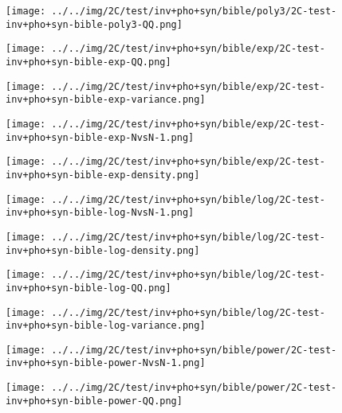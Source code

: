 \begin{figure}[H]
\centering	\texttt{[image: ../../img/2C/test/inv+pho+syn/bible/poly3/2C-test-inv+pho+syn-bible-poly3-QQ.png]}
\end{figure}
\begin{figure}[H]
\centering	\texttt{[image: ../../img/2C/test/inv+pho+syn/bible/exp/2C-test-inv+pho+syn-bible-exp-QQ.png]}
\end{figure}
\begin{figure}[H]
\centering	\texttt{[image: ../../img/2C/test/inv+pho+syn/bible/exp/2C-test-inv+pho+syn-bible-exp-variance.png]}
\end{figure}
\begin{figure}[H]
\centering	\texttt{[image: ../../img/2C/test/inv+pho+syn/bible/exp/2C-test-inv+pho+syn-bible-exp-NvsN-1.png]}
\end{figure}
\begin{figure}[H]
\centering	\texttt{[image: ../../img/2C/test/inv+pho+syn/bible/exp/2C-test-inv+pho+syn-bible-exp-density.png]}
\end{figure}
\begin{figure}[H]
\centering	\texttt{[image: ../../img/2C/test/inv+pho+syn/bible/log/2C-test-inv+pho+syn-bible-log-NvsN-1.png]}
\end{figure}
\begin{figure}[H]
\centering	\texttt{[image: ../../img/2C/test/inv+pho+syn/bible/log/2C-test-inv+pho+syn-bible-log-density.png]}
\end{figure}
\begin{figure}[H]
\centering	\texttt{[image: ../../img/2C/test/inv+pho+syn/bible/log/2C-test-inv+pho+syn-bible-log-QQ.png]}
\end{figure}
\begin{figure}[H]
\centering	\texttt{[image: ../../img/2C/test/inv+pho+syn/bible/log/2C-test-inv+pho+syn-bible-log-variance.png]}
\end{figure}
\begin{figure}[H]
\centering	\texttt{[image: ../../img/2C/test/inv+pho+syn/bible/power/2C-test-inv+pho+syn-bible-power-NvsN-1.png]}
\end{figure}
\begin{figure}[H]
\centering	\texttt{[image: ../../img/2C/test/inv+pho+syn/bible/power/2C-test-inv+pho+syn-bible-power-QQ.png]}
\end{figure}
